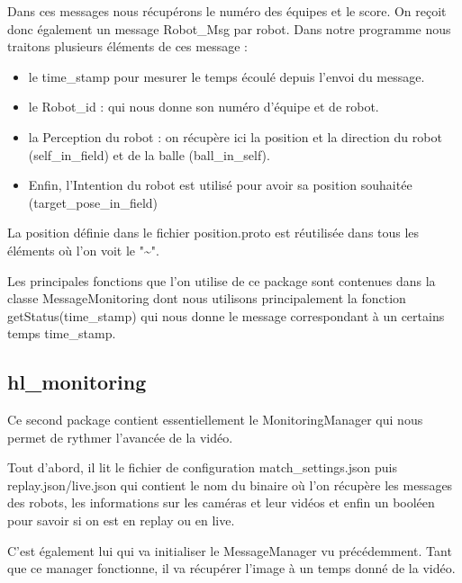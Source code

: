 Dans ces messages nous récupérons le numéro des équipes et le score.
On reçoit donc également un message Robot\_Msg par robot. Dans notre programme nous traitons plusieurs éléments de ces message :
\begin{itemize}
    \item le time\_stamp pour mesurer le temps écoulé depuis l'envoi du message.
    \item le Robot\_id : qui nous donne son numéro d'équipe et de robot.
    \item la Perception du robot : on récupère ici la position et la direction du robot (self\_in\_field) et de la balle (ball\_in\_self).
    \item Enfin, l'Intention du robot est utilisé pour avoir sa position souhaitée (target\_pose\_in\_field)
    
\end{itemize}
La position définie dans le fichier position.proto est réutilisée dans tous les éléments où l'on voit le "\textasciitilde". 
\bigskip

Les principales fonctions que l'on utilise de ce package sont contenues dans la classe MessageMonitoring dont nous utilisons principalement la fonction getStatus(time\_stamp) qui nous donne le message correspondant à un certains temps time\_stamp.
\bigskip

\subsection{hl\_monitoring}

Ce second package contient essentiellement le MonitoringManager qui nous permet de rythmer l'avancée de la vidéo. 
\bigskip

Tout d'abord, il lit le fichier de configuration match\_settings.json puis replay.json/live.json qui contient le nom du binaire où l'on récupère les messages des robots, les informations sur les caméras et leur vidéos et enfin un booléen pour savoir si on est en replay ou en live.

C'est également lui qui va initialiser le MessageManager vu précédemment. Tant que ce manager fonctionne, il va récupérer l'image à un temps donné de la vidéo. 
\bigskip

